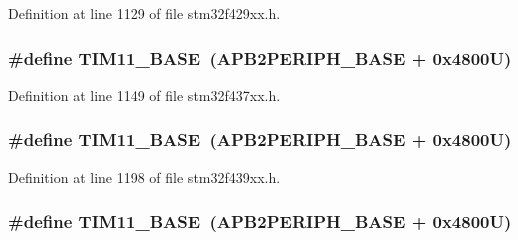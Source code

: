 Definition at line 1129 of file stm32f429xx.\+h.

\subsubsection[{\texorpdfstring{T\+I\+M11\+\_\+\+B\+A\+SE}{TIM11_BASE}}]{\setlength{\rightskip}{0pt plus 5cm}\#define T\+I\+M11\+\_\+\+B\+A\+SE~({\bf A\+P\+B2\+P\+E\+R\+I\+P\+H\+\_\+\+B\+A\+SE} + 0x4800\+U)}\hypertarget{group___peripheral__memory__map_ga3a4a06bb84c703084f0509e105ffaf1d}{}\label{group___peripheral__memory__map_ga3a4a06bb84c703084f0509e105ffaf1d}


Definition at line 1149 of file stm32f437xx.\+h.

\subsubsection[{\texorpdfstring{T\+I\+M11\+\_\+\+B\+A\+SE}{TIM11_BASE}}]{\setlength{\rightskip}{0pt plus 5cm}\#define T\+I\+M11\+\_\+\+B\+A\+SE~({\bf A\+P\+B2\+P\+E\+R\+I\+P\+H\+\_\+\+B\+A\+SE} + 0x4800\+U)}\hypertarget{group___peripheral__memory__map_ga3a4a06bb84c703084f0509e105ffaf1d}{}\label{group___peripheral__memory__map_ga3a4a06bb84c703084f0509e105ffaf1d}


Definition at line 1198 of file stm32f439xx.\+h.

\subsubsection[{\texorpdfstring{T\+I\+M11\+\_\+\+B\+A\+SE}{TIM11_BASE}}]{\setlength{\rightskip}{0pt plus 5cm}\#define T\+I\+M11\+\_\+\+B\+A\+SE~({\bf A\+P\+B2\+P\+E\+R\+I\+P\+H\+\_\+\+B\+A\+SE} + 0x4800\+U)}\hypertarget{group___peripheral__memory__map_ga3a4a06bb84c703084f0509e105ffaf1d}{}\label{group___peripheral__memory__map_ga3a4a06bb84c703084f0509e105ffaf1d}


